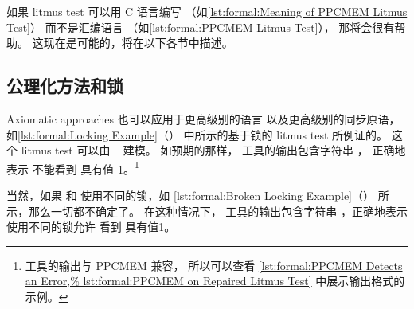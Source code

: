 如果 litmus test 可以用 C 语言编写
（如\cref{lst:formal:Meaning of PPCMEM Litmus Test}）
而不是汇编语言
（如\cref{lst:formal:PPCMEM Litmus Test}），
那将会很有帮助。
这现在是可能的，将在以下各节中描述。

\subsection{公理化方法和锁}
\label{sec:formal:Axiomatic Approaches and Locking}

Axiomatic approaches 也可以应用于更高级别的语言
以及更高级别的同步原语，
如\cref{lst:formal:Locking Example}（）
中所示的基于锁的 litmus test 所例证的。
这个 litmus test 可以由
~%
\cite{Alglave:2018:FSC:3173162.3177156,LucMaranget2018lock.cat}建模。
如预期的那样， 工具的输出包含字符串 ，
正确地表示  不能看到  具有值
1。\footnote{
	 工具的输出与 PPCMEM 兼容，
	所以可以查看
	\cref{lst:formal:PPCMEM Detects an Error,%
	lst:formal:PPCMEM on Repaired Litmus Test}
	中展示输出格式的示例。}

\begin{listing}

\caption{锁示例}
\label{lst:formal:Locking Example}
\end{listing}

\QuickQuizEnd

\begin{listing}

\caption{有缺陷的锁示例}
\label{lst:formal:Broken Locking Example}
\end{listing}

当然，如果  和  使用不同的锁，如
\cref{lst:formal:Broken Locking Example}（）
所示，那么一切都不确定了。
在这种情况下， 工具的输出包含字符串
，正确地表示使用不同的锁允许
 看到  具有值1。

